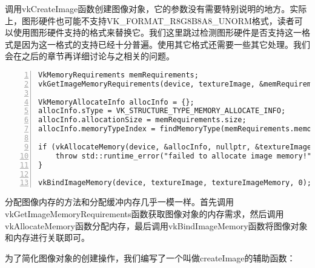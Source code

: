 \documentclass{ctexart}
\begin{document}
调用vkCreateImage函数创建图像对象，它的参数没有需要特别说明的地方。实际上，图形硬件也可能不支持VK\_FORMAT\_R8G8B8A8\_UNORM格式，读者可以使用图形硬件支持的格式来替换它。我们这里跳过检测图形硬件是否支持这一格式是因为这一格式的支持已经十分普遍。使用其它格式还需要一些其它处理。我们会在之后的章节再详细讨论与之相关的问题。

\begin{lstlisting}[language={[ANSI]C},keywordstyle=\color{blue!70},commentstyle=\color{red!50!green!50!blue!50},frame=shadowbox, rulesepcolor=\color{red!20!green!20!blue!20},basicstyle=\small,numbers=left, numberstyle=\tiny,breaklines=true]
VkMemoryRequirements memRequirements;
vkGetImageMemoryRequirements(device, textureImage, &memRequirements);

VkMemoryAllocateInfo allocInfo = {};
allocInfo.sType = VK_STRUCTURE_TYPE_MEMORY_ALLOCATE_INFO;
allocInfo.allocationSize = memRequirements.size;
allocInfo.memoryTypeIndex = findMemoryType(memRequirements.memoryTypeBits, VK_MEMORY_PROPERTY_DEVICE_LOCAL_BIT);

if (vkAllocateMemory(device, &allocInfo, nullptr, &textureImageMemory) != VK_SUCCESS) {
	throw std::runtime_error("failed to allocate image memory!");
}

vkBindImageMemory(device, textureImage, textureImageMemory, 0);
\end{lstlisting}

分配图像内存的方法和分配缓冲内存几乎一模一样。首先调用vkGetImageMemoryRequirements函数获取图像对象的内存需求，然后调用vkAllocateMemory函数分配内存，最后调用vkBindImageMemory函数将图像对象和内存进行关联即可。

为了简化图像对象的创建操作，我们编写了一个叫做createImage的辅助函数：
\end{document}

